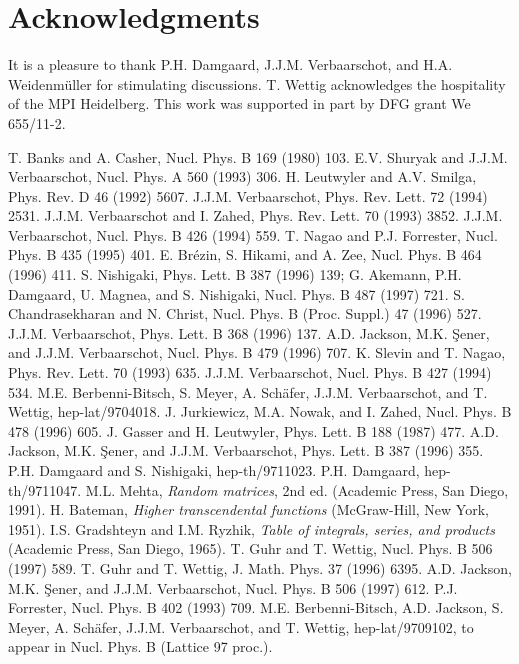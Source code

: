 \section*{Acknowledgments}

It is a pleasure to thank P.H. Damgaard, J.J.M. Verbaarschot, and H.A.
Weidenm\"uller for stimulating discussions.  T. Wettig acknowledges
the hospitality of the MPI Heidelberg.  This work was supported in
part by DFG grant We 655/11-2.


\begin{references}
 T. Banks and A. Casher, Nucl. Phys. B 169 (1980)
  103. 
 E.V. Shuryak and J.J.M. Verbaarschot, Nucl. Phys. A
  560 (1993) 306.
 H. Leutwyler and A.V. Smilga, Phys. Rev. D 46 (1992)
  5607. 
 J.J.M. Verbaarschot, Phys. Rev. Lett. 72
  (1994) 2531.
 J.J.M. Verbaarschot and I. Zahed, Phys. Rev.
  Lett. 70 (1993) 3852.
 J.J.M. Verbaarschot, Nucl. Phys. B 426 (1994) 559.
 T. Nagao and P.J. Forrester, Nucl. Phys. B 435 (1995)
  401.
 E. Br\'ezin, S. Hikami, and A. Zee, Nucl. Phys.
  B 464 (1996) 411.
 S. Nishigaki, Phys. Lett. B 387 (1996) 139;
  G. Akemann, P.H. Damgaard, U. Magnea, and S. Nishigaki, Nucl. Phys. B 
  487 (1997) 721. 
 S. Chandrasekharan and N. Christ, Nucl. Phys. B
  (Proc. Suppl.)  47 (1996) 527.
 J.J.M. Verbaarschot, Phys. Lett. B 368 (1996) 137.
 A.D. Jackson, M.K. \c Sener, and
  J.J.M. Verbaarschot, Nucl. Phys. B 479 (1996) 707.
 K. Slevin and T. Nagao, Phys. Rev. Lett. 70 (1993) 635. 
 J.J.M. Verbaarschot, Nucl. Phys. B 427 (1994) 534.
 M.E. Berbenni-Bitsch, S. Meyer, A. Sch\"afer,
  J.J.M. Verbaarschot, and T. Wettig, hep-lat/9704018.
 J. Jurkiewicz, M.A. Nowak, and I. Zahed,
  Nucl. Phys. B 478 (1996) 605.
 J. Gasser and H. Leutwyler, Phys. Lett. B 188 (1987)
  477. 
 A.D. Jackson, M.K. \c Sener, and
  J.J.M. Verbaarschot, Phys. Lett. B 387 (1996) 355.
 P.H. Damgaard and S. Nishigaki, hep-th/9711023.
 P.H. Damgaard, hep-th/9711047.
 M.L. Mehta, {\em Random matrices}, 2nd ed. (Academic 
  Press, San Diego, 1991).
 H. Bateman, {\em Higher transcendental functions}
  (McGraw-Hill, New York, 1951).
 I.S. Gradshteyn and I.M. Ryzhik, {\em Table of
    integrals, series, and products} (Academic Press, San Diego, 1965).
 T. Guhr and T. Wettig, Nucl. Phys. B 506 (1997) 589.
 T. Guhr and T. Wettig, J. Math. Phys. 37 (1996)
  6395. 
 A.D. Jackson, M.K. \c Sener, and
  J.J.M. Verbaarschot, Nucl. Phys. B 506 (1997) 612.
 P.J. Forrester, Nucl. Phys. B 402 (1993) 709.
 M.E. Berbenni-Bitsch, A.D. Jackson, S. Meyer,
  A. Sch\"afer, J.J.M. Verbaarschot, and T. Wettig, hep-lat/9709102,
  to appear in Nucl. Phys. B (Lattice 97 proc.).
\end{references}

